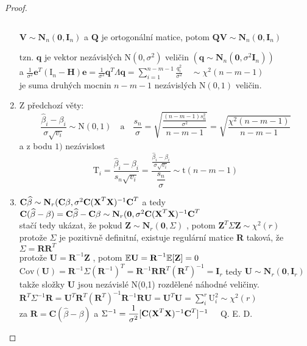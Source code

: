 \begin{proof}
\begin{enumerate}
$$$$
\begin{theorem}
	$ \textbf{V} \sim \textbf{N}_n ( \textbf{0} , \textbf{I}_n )  $ a $ \textbf{Q} $ je ortogonální matice, potom $ \textbf{QV} \sim \textbf{N}_n ( \textbf{0} , \textbf{I}_n ) $
\end{theorem}
tzn. $ \textbf{q} $ je vektor nezávislých $ \text{N}(0,\sigma^{2}) $ veličin $ ( \textbf{q} \sim \textbf{N}_n ( \textbf{0} , \sigma^{2} \textbf{I}_n )) $ \\
a $ \frac{1}{\sigma^{2}} \textbf{e}^{T} ( \text{I}_n - \textbf{H} ) \textbf{e} = \frac{1}{\sigma^{2}} \textbf{q}^{T} \Lambda \textbf{q} = \sum_{i = 1}^{n-m-1}\frac{q_i^{2}}{\sigma^{2}} \quad \sim \chi^{2} (n - m - 1 ) $ \\
je suma druhých mocnin $ n-m-1 $ nezávislých $ \text{N}(0,1) $ veličin.
\item Z předchozí věty:
$$
  \frac{\widehat{\beta}_i - \beta_i}{\sigma \sqrt{v_i}} \sim \text{N}(0,1) \quad \text{a} \quad \frac{s_n}{\sigma} = \sqrt{\frac{\frac{(n-m-1) s_n^{2}}{\sigma^{2}}}{n-m-1}} = \sqrt{\frac{\chi^{2}( n-m-1 )}{n-m-1}}
$$
a z bodu $ 1) $ nezávislost
$$
  \text{T}_i = \frac{\widehat{\beta}_i - \beta_i}{s_n \sqrt{v_i}} = \dfrac{\frac{\widehat{\beta}_i - \beta_i}{\sigma \sqrt{v_i}}}{\dfrac{s_n}{\sigma}} \sim \text{t}(n-m-1)
$$
\item
$ \textbf{C} \widehat{\beta} \sim \textbf{N}_r ( \textbf{C} \beta , \sigma^{2} \textbf{C} ( \textbf{X} ^{T} \textbf{X} )^{-1} \textbf{C}^{T} $ a tedy \\
$ \textbf{C} ( \widehat{\beta} - \beta ) = \textbf{C}\widehat{\beta} - \textbf{C} \beta \sim \textbf{N}_r ( \textbf{0} , \sigma^{2} \textbf{C} ( \textbf{X} ^{T} \textbf{X} )^{-1} \textbf{C}^{T} $ \\
stačí tedy ukázat, že pokud $ \textbf{Z} \sim \textbf{N}_r ( \textbf{0}, \Sigma ) $ , potom $ \textbf{Z}^{T} \Sigma \textbf{Z} \sim \chi^{2}(r) $ \\
protože $ \Sigma $ je pozitivně definitní, existuje regulární matice \textbf{R} taková, že $ \Sigma = \textbf{RR}^{T} $ \\
protože $ \textbf{U} = \textbf{R}^{-1} \textbf{Z} $ , potom $ \mathbb{E} \textbf{U} = \textbf{R}^{-1} \mathbb{E} [ \textbf{Z} ] = 0 $ \\
$ \text{Cov}(\textbf{U}) = \textbf{R}^{-1} \Sigma (\textbf{R}^{-1} )^{T} = \textbf{R}^{-1} \textbf{RR}^{T} ( \textbf{R}^{T})^{-1} = \textbf{I}_r $ tedy $ \textbf{U} \sim \textbf{N}_r ( \textbf{0}, \textbf{I}_r ) $ \\
takže složky \textbf{U} jsou nezávislé N(0,1) rozdělené náhodné veličiny. \\
$ \textbf{R}^{T} \Sigma ^{-1} \textbf{R} = \textbf{U}^{T} \textbf{R}^{T} ( \textbf{R}^{T} )^{-1} \textbf{R}^{-1} \textbf{R} \textbf{U} = \textbf{U}^{T} \textbf{U} = \sum_i^{r} \text{U}_i^{2} \sim \chi^{2}(r) $ \\
za $ \textbf{R} = \textbf{C} ( \widehat{\beta} - \beta ) $ a $ \Sigma^{-1} = \dfrac{1}{\sigma^{2}} [ \textbf{C} ( \textbf{X} ^{T} \textbf{X} )^{-1} \textbf{C}^{T} ]^{-1} \quad $ Q. E. D. 

\end{enumerate}
\end{proof}

